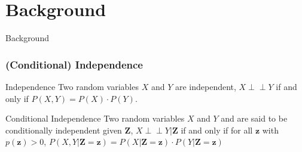 \documentclass{beamer}
\def\ci{\perp\!\!\!\!\!\perp}
\begin{document}
\section{Background}
\begin{frame}
	\begin{center} \Huge{Background} \end{center}
\end{frame}
\begin{frame}
	\frametitle{(Conditional) Independence}
	\begin{block}{Independence}
		Two random variables $ X $ and $ Y $ are independent,
		$ X \ci Y $ if and only if $ P(X, Y) = P(X) \cdot P(Y) $.
	\end{block}
	\vspace{1em}

	\begin{block}{Conditional Independence}
		Two random variables $ X $ and $ Y $ and are said to be
		conditionally independent given $ \bm{Z} $, $ X \ci Y | \bm{Z}
		$ if and only if for all $ \bm{z} $ with $ p(\bm{z}) > 0 $, $ P(X, Y |
		\bm{Z}=\bm{z}) = P(X | \bm{Z}=\bm{z}) \cdot P(Y | \bm{Z}=\bm{z}) $
	\end{block}
\end{frame}
\end{document}
